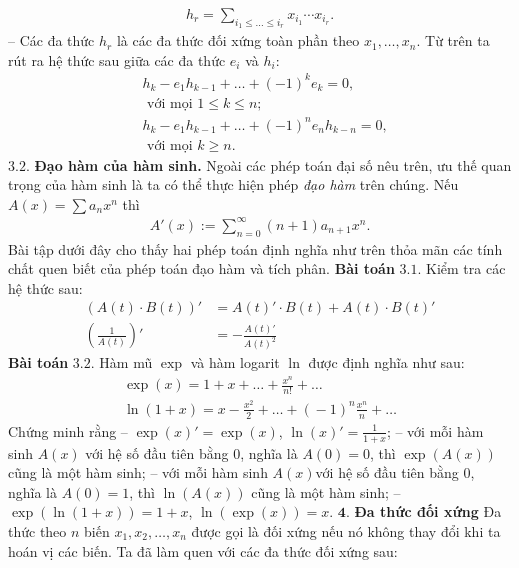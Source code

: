\begin{multicols}{2}
	\begin{align*}
		h_r=\sum_{i_1\leq\ldots\leq i_r}x_{i_1}\cdots x_{i_r}.
	\end{align*}
	-- Các đa thức  $h_r$ là các { đa thức đối xứng toàn phần} theo  $x_1,\ldots, x_n$. 
	Từ trên ta rút ra hệ thức sau giữa các đa thức $e_i$ và $h_i$:
	\begin{align*}
		&h_k-e_1h_{k-1}+\ldots+(-1)^ke_k=0,\\
		&\text{ với mọi }   1\leq k\leq n;\\
		&h_k-e_1h_{k-1}+\ldots+(-1)^ne_n h_{k-n}=0,\\
		&\text{ với mọi }    k\geq n.
	\end{align*}
	$\pmb{3.2.}$ \textbf{\color{hoccungpi}Đạo hàm của hàm sinh.}
	Ngoài các phép toán đại số nêu trên, ưu thế quan trọng của hàm sinh là ta có thể thực hiện phép {\em đạo hàm} trên chúng. 
	\vskip 0.1cm
	Nếu $A(x)=\sum a_nx^n$ thì 
	\begin{align*}
		A'(x):=\sum_{n=0}^\infty  (n+1)a_{n+1}x^n.
	\end{align*} 
	Bài tập dưới đây cho thấy hai phép toán định nghĩa như trên thỏa mãn các tính chất quen biết của phép toán đạo hàm và tích phân.
	\vskip 0.1cm
	\textbf{\color{hoccungpi}Bài toán} $\pmb{3.1.}$ Kiểm tra các hệ thức sau:
		\begin{align*}
			(A(t)\cdot B(t))'&=A(t)'\cdot B(t)+A(t)\cdot B(t)'\\
			\left(\frac 1{A(t)}\right)'&=-\frac{A(t)'}{A(t)^2}		
		\end{align*}
	\textbf{\color{hoccungpi}Bài toán} $\pmb{3.2.}$ Hàm mũ $\exp$ và hàm logarit $\ln$ được định nghĩa như sau:
	\begin{align*}
		\exp(x)=1+x+\ldots+\frac{x^n}{n!}+\ldots \tag{$8$}\\
		\ln(1\!+\!x)\!=\!x\!-\!\frac{x^2}2\!+\!\ldots\!+\!(\!-\!1)^n\frac{x^n}n\!+\!\ldots\! \tag{$9$}
	\end{align*}
	Chứng minh rằng
	\vskip 0.1cm
	-- $\exp(x)'=\exp(x)$, $\ln(x)'=\frac1{1+x}$;
	\vskip 0.1cm
	-- với mỗi hàm sinh $A(x)$ với hệ số đầu tiên bằng $0$, nghĩa là $A(0)=0$, thì $\exp(A(x))$ cũng là một hàm sinh;
	\vskip 0.1cm
	-- với mỗi hàm sinh $A(x)$với hệ số đầu tiên bằng $0$, nghĩa là $A(0)=1$, thì $\ln(A(x))$ cũng là một hàm sinh;
	\vskip 0.1cm
	-- $\exp(\ln(1+x))=1+x$, $\ln(\exp(x))=x$.
	\vskip 0.1cm
	$\pmb{4.}$ \textbf{\color{hoccungpi}Đa thức đối xứng} 
	\vskip 0.1cm
	Đa thức theo $n$ biến $x_1,x_2,\ldots,x_n$ được gọi là đối xứng nếu nó không thay đổi khi ta hoán vị các biến. Ta đã làm quen với các đa thức đối xứng sau: 

\end{multicols}
